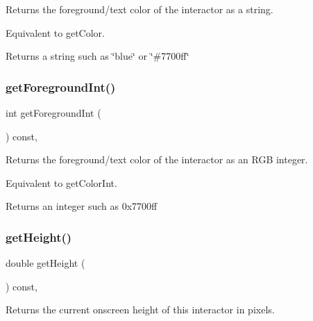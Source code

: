 Returns the foreground/text color of the interactor as a string. 

Equivalent to get\+Color. \begin{DoxyReturn}{Returns}
a string such as \char`\"{}blue\char`\"{} or \char`\"{}\#7700ff\char`\"{} 
\end{DoxyReturn}
\mbox{\label{classGInteractor_ac3b12ab385a6ef9ae90fc879860ba726}} 
\subsubsection{\texorpdfstring{get\+Foreground\+Int()}{getForegroundInt()}}
{\footnotesize\ttfamily int get\+Foreground\+Int (\begin{DoxyParamCaption}{ }\end{DoxyParamCaption}) const\hspace{0.3cm}{\ttfamily [virtual]}, {\ttfamily [inherited]}}



Returns the foreground/text color of the interactor as an R\+GB integer. 

Equivalent to get\+Color\+Int. \begin{DoxyReturn}{Returns}
an integer such as 0x7700ff 
\end{DoxyReturn}
\mbox{\label{classGInteractor_a1e7e353362434072875264cf95629f99}} 
\subsubsection{\texorpdfstring{get\+Height()}{getHeight()}}
{\footnotesize\ttfamily double get\+Height (\begin{DoxyParamCaption}{ }\end{DoxyParamCaption}) const\hspace{0.3cm}{\ttfamily [virtual]}, {\ttfamily [inherited]}}



Returns the current onscreen height of this interactor in pixels. 

\mbox{\label{classGInteractor_aaed62a73004939a64da6f0eb9eb64d73}} 
